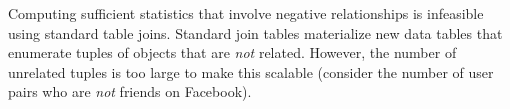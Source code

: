 \documentclass{vldb}
\begin{document}
Computing sufficient statistics that involve negative relationships is infeasible using standard table joins. 
%
Standard join tables materialize new data tables that enumerate tuples of objects that are {\em not} related. %
However, the number of unrelated tuples is too large to make this scalable (consider the number of user pairs who are {\em not} friends on Facebook). 
\end{document}
